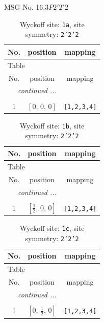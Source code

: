 \documentclass[fleqn,8pt]{jsarticle}
\begin{document}
\setcounter{MaxMatrixCols}{32}

\renewcommand{\tablename}{Table~}
\renewcommand{\figurename}{Figure~}
\begin{center}
\LARGE
MSG No. 16.3\quad$P2'2'2$
\end{center}
\renewcommand{\arraystretch}{1.2}
\begin{longtable}{ccc}
\caption{Wyckoff site: {\tt 1a}, site symmetry: {\tt 2'2'2}}
 \\
 \hline \hline
No. & position & mapping \\ \hline \endfirsthead

\multicolumn{2}{l}{\tablename\ \thetable{}} \\
 \hline \hline
No. & position & mapping \\ \hline \endhead

 \hline \hline
\multicolumn{2}{r}{\footnotesize\it continued ...} \\ \endfoot

 \hline \hline
\multicolumn{2}{r}{} \\ \endlastfoot

1 & $\left[ 0,\, 0,\, 0 \right]$ & {\tt [1,2,3,4]} \\
\end{longtable}
\renewcommand{\arraystretch}{1.2}
\begin{longtable}{ccc}
\caption{Wyckoff site: {\tt 1b}, site symmetry: {\tt 2'2'2}}
 \\
 \hline \hline
No. & position & mapping \\ \hline \endfirsthead

\multicolumn{2}{l}{\tablename\ \thetable{}} \\
 \hline \hline
No. & position & mapping \\ \hline \endhead

 \hline \hline
\multicolumn{2}{r}{\footnotesize\it continued ...} \\ \endfoot

 \hline \hline
\multicolumn{2}{r}{} \\ \endlastfoot

1 & $\left[ \frac{1}{2},\, 0,\, 0 \right]$ & {\tt [1,2,3,4]} \\
\end{longtable}
\renewcommand{\arraystretch}{1.2}
\begin{longtable}{ccc}
\caption{Wyckoff site: {\tt 1c}, site symmetry: {\tt 2'2'2}}
 \\
 \hline \hline
No. & position & mapping \\ \hline \endfirsthead

\multicolumn{2}{l}{\tablename\ \thetable{}} \\
 \hline \hline
No. & position & mapping \\ \hline \endhead

 \hline \hline
\multicolumn{2}{r}{\footnotesize\it continued ...} \\ \endfoot

 \hline \hline
\multicolumn{2}{r}{} \\ \endlastfoot

1 & $\left[ 0,\, \frac{1}{2},\, 0 \right]$ & {\tt [1,2,3,4]} \\
\end{longtable}
\end{document}

